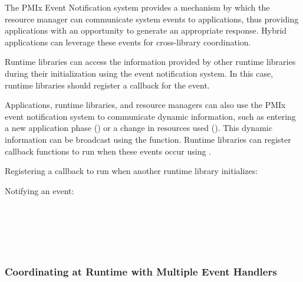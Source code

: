 The PMIx Event Notification system provides a mechanism by which the resource manager can communicate system events to applications, thus providing applications with an opportunity to generate an appropriate response. Hybrid applications can leverage these events for cross-library coordination.

Runtime libraries can access the information provided by other runtime libraries during their initialization using the event notification system.  In this case, runtime libraries should register a callback for the  event.

Applications, runtime libraries, and resource managers can also use the PMIx event notification system to communicate dynamic information, such as entering a new application phase () or a change in resources used ().  This dynamic information can be broadcast using the  function.  Runtime libraries can register callback functions to run when these events occur using .


Registering a callback to run when another runtime library initializes:


Notifying an event:


{\large {}}

 \\
 \\
 \\
 \\

{\large {}}

{\large {}}




\subsubsection{Coordinating at Runtime with Multiple Event Handlers}

